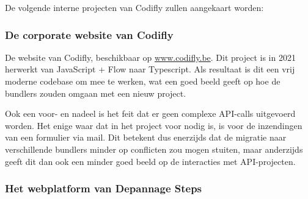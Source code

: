 De volgende interne projecten van Codifly zullen aangekaart worden:

\subsubsection{De corporate website van Codifly}

De website van Codifly, beschikbaar op \href{https://www.codifly.be}{www.codifly.be}. Dit project is in 2021 herwerkt van JavaScript + Flow naar Typescript. Als resultaat is dit een vrij moderne codebase om mee te werken, wat een goed beeld geeft op hoe de bundlers zouden omgaan met een nieuw project.

Ook een voor- en nadeel is het feit dat er geen complexe API-calls uitgevoerd worden. Het enige waar dat in het project voor nodig is, is voor de inzendingen van een formulier via mail. Dit betekent dus enerzijds dat de migratie naar verschillende bundlers minder op conflicten zou mogen stuiten, maar anderzijds geeft dit dan ook een minder goed beeld op de interacties met API-projecten.

\subsubsection{Het webplatform van Depannage Steps}

